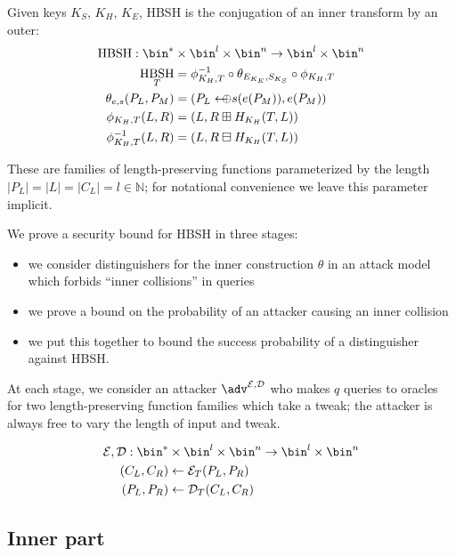 \documentclass[journal=tosc,preprint,floatrow,submission]{iacrtrans}
\DeclareMathOperator{\HBSH}{HBSH}
\newcommand*{\arrowoplus}{\leftarrow\mkern-12mu\oplus}
\newcommand*{\calE}{\mathcal{E}}
\newcommand*{\calD}{\mathcal{D}}
\begin{document}
Given keys $K_S$, $K_H$, $K_E$, HBSH is the conjugation of an inner transform by an outer:
\begin{align*}
    \HBSH:
    \bin^* &\times \bin^l \times \bin^n \rightarrow \bin^l \times \bin^n \\
    \HBSH_{T} &= \phi^{-1}_{K_H, T}
    \circ \theta_{E_{K_E}, S_{K_S}} \circ \phi_{K_H, T} \\
    \theta_{e, s}(P_L, P_M) &= (P_L \arrowoplus s(e(P_M)), e(P_M)) \\
    \phi_{K_H, T}(L, R) &= (L, R \boxplus H_{K_H}(T, L)) \\
    \phi^{-1}_{K_H, T}(L, R) &= (L, R \boxminus H_{K_H}(T, L))
\end{align*}

These are families of length-preserving functions parameterized by the length
$|P_L| = |L| = |C_L| = l \in \mathbb{N}$;
for notational convenience we leave this parameter implicit.

We prove a security bound for HBSH in three stages:
\begin{itemize}
    \item we consider distinguishers for the inner construction $\theta$ in an
    attack model which forbids ``inner collisions'' in queries
    \item we prove a bound on the probability of an attacker causing an inner collision
    \item we put this together to bound the success probability of a distinguisher against
    HBSH.
\end{itemize}

At each stage, we consider an attacker \(\adv^{\calE, \calD}\) who makes $q$ queries
to oracles for
two length-preserving function families which take a tweak; the attacker is always free to vary
the length of input and tweak.

\begin{align*}
\calE, \calD:
\bin^* &\times \bin^l \times \bin^n \rightarrow \bin^l \times \bin^n \\
(C_L, C_R) &\leftarrow \calE_T(P_L, P_R) \\
(P_L, P_R) &\leftarrow \calD_T(C_L, C_R) \\
\end{align*}

\subsection{Inner part}\label{innerpart}
\end{document}
